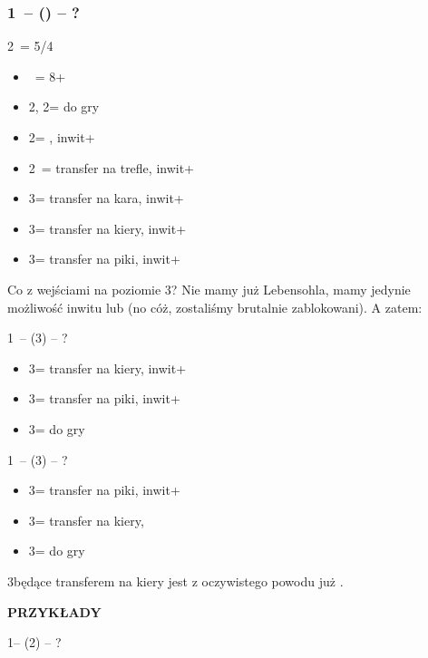 \documentclass[12pt, a4paper]{article}
\begin{document}
\subsubsection*{1\ntx\ -- (\alrts{2\clubs}) -- ?}
2\clubs\ = 5/4 \major
\begin{itemize}
    \item \dbl\ = 8+
    \item 2\diams, 2\hearts = do gry
    \item 2\spades = \minor, inwit+
    \item 2\nt\ = transfer na trefle, inwit+
    \item 3\clubs = transfer na kara, inwit+
    \item 3\diams = transfer na kiery, inwit+
    \item 3\hearts = transfer na piki, inwit+
\end{itemize}

Co z wejściami na poziomie 3? Nie mamy już Lebensohla,
mamy jedynie możliwość inwitu lub \gf (no cóż, zostaliśmy
brutalnie zablokowani). A zatem:

1\nt\ -- (3\clubs) -- ?
\begin{itemize}
    \item 3\diams = transfer na kiery, inwit+
    \item 3\hearts = transfer na piki, inwit+
    \item 3\nt = do gry
\end{itemize}

1\nt\ -- (3\diams) -- ?
\begin{itemize}
    \item 3\hearts = transfer na piki, inwit+
    \item 3\spades = transfer na kiery, \gf \imp
    \item 3\nt = do gry
\end{itemize}

3\spades będące transferem na kiery jest z oczywistego powodu już \gf.

\newpage
\textbf{PRZYKŁADY}

1\nt -- (2\spades) -- ?
\end{document}
